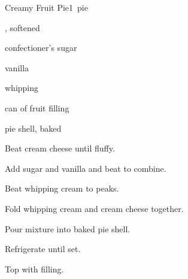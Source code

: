 \begin{recipe}{Creamy Fruit Pie}{}{1~pie}

\begin{ingredients}
\item {} , softened
\item {} confectioner's sugar
\item {} vanilla
\item {} whipping 
\item can of fruit filling
\item pie shell, baked
\end{ingredients}

\begin{directions}
\item Beat cream cheese until fluffy.
\item Add sugar and vanilla and beat to combine.
\item Beat whipping cream to peaks.
\item Fold whipping cream and cream cheese together.
\item Pour mixture into baked pie shell.
\item Refrigerate until set.
\item Top with filling.
\end{directions}

\end{recipe}
